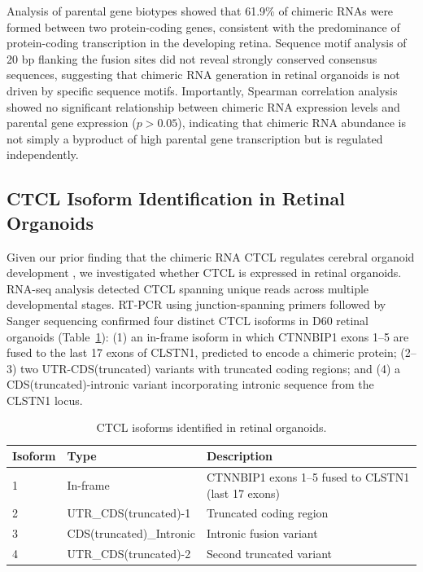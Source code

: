 \documentclass[12pt]{article}
\begin{document}
Analysis of parental gene biotypes showed that 61.9\% of chimeric RNAs were formed between two protein-coding genes, consistent with the predominance of protein-coding transcription in the developing retina. Sequence motif analysis of 20 bp flanking the fusion sites did not reveal strongly conserved consensus sequences, suggesting that chimeric RNA generation in retinal organoids is not driven by specific sequence motifs. Importantly, Spearman correlation analysis showed no significant relationship between chimeric RNA expression levels and parental gene expression ($p > 0.05$), indicating that chimeric RNA abundance is not simply a byproduct of high parental gene transcription but is regulated independently.

\subsection{CTCL Isoform Identification in Retinal Organoids}

Given our prior finding that the chimeric RNA CTCL regulates cerebral organoid development \citep{wu2019chimeric}, we investigated whether CTCL is expressed in retinal organoids. RNA-seq analysis detected CTCL spanning unique reads across multiple developmental stages. RT-PCR using junction-spanning primers followed by Sanger sequencing confirmed four distinct CTCL isoforms in D60 retinal organoids (Table~\ref{tab:isoforms}): (1) an in-frame isoform in which CTNNBIP1 exons 1--5 are fused to the last 17 exons of CLSTN1, predicted to encode a chimeric protein; (2--3) two UTR-CDS(truncated) variants with truncated coding regions; and (4) a CDS(truncated)-intronic variant incorporating intronic sequence from the CLSTN1 locus.

\begin{table}[htbp]
\centering
\caption{CTCL isoforms identified in retinal organoids.}
\label{tab:isoforms}
\begin{tabular}{llp{7cm}}
\toprule
Isoform & Type & Description \\
\midrule
1 & In-frame & CTNNBIP1 exons 1--5 fused to CLSTN1 (last 17 exons) \\
2 & UTR\_CDS(truncated)-1 & Truncated coding region \\
3 & CDS(truncated)\_Intronic & Intronic fusion variant \\
4 & UTR\_CDS(truncated)-2 & Second truncated variant \\
\bottomrule
\end{tabular}
\end{table}
\end{document}
